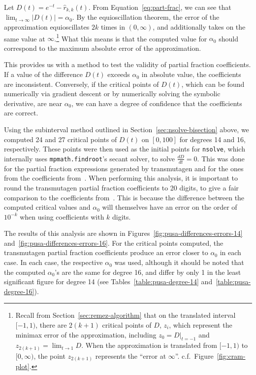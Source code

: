 Let $D(t) = e^{-t} - \hat{r}_{k,k}(t)$. From Equation~\ref{eq:part-frac}, we can see that
$\lim_{t\to\infty}{\left|D(t) \right|} = \alpha_0$. By the
equioscillation theorem, the error of the approximation equioscillates $2k$
times in $(0, \infty)$, and additionally takes on the same value at
$\infty$.\footnote{Recall from Section~\ref{sec:remez-algorithm} that on the
  translated interval $[-1, 1)$, there are $2(k+1)$ critical points of $D$,
  $z_i$, which represent the minimax error of the approximation, including
  $z_0 = D|_{t=-1}$ and $z_{2(k+1)}=\lim_{t\to 1}{D}$. When the approximation
  is translated from $[-1, 1)$ to $[0, \infty)$, the point $z_{2(k + 1)}$
  represents the ``error at $\infty$''. c.f.\ Figure~\ref{fig:cram-plot}.}
What this means is that the computed value for $\alpha_0$ should correspond to
the maximum absolute error of the approximation.

This provides us with a method to test the validity of partial fraction
coefficients. If a value of the difference $D(t)$ exceeds $\alpha_0$ in
absolute value, the coefficients are inconsistent. Conversely, if the critical
points of $D(t)$, which can be found numerically via gradient descent or by
numerically solving the symbolic derivative, are near $\alpha_0$, we can have
a degree of confidence that the coefficients are correct.

Using the subinterval method outlined in Section~\ref{sec:nsolve-bisection}
above, we computed 24 and 27 critical points of $D(t)$ on $[0, 100]$ for degrees
14 and 16, respectively. These points were then used as the initial points for
\texttt{nsolve}, which internally uses \texttt{mpmath.findroot}'s secant
solver, to solve $\frac{dD}{dt}=0$. This was done for the partial fraction
expressions generated by transmutagen and for the ones from the coefficients
from~\cite{pusa2012correction}.  When performing this analysis, it is
important to round the transmutagen partial fraction coefficients to 20
digits, to give a fair comparison to the coefficients
from~\cite{pusa2012correction}. This is because the difference between the
computed critical values and $\alpha_0$ will themselves have an error on the order
of $10^{-k}$ when using coefficients with $k$ digits.

The results of this analysis are shown in
Figures~\ref{fig:pusa-differences-errors-14}
and~\ref{fig:pusa-differences-errors-16}. For the critical points computed,
the transmutagen partial fraction coefficients produce an error closer to
$\alpha_0$ in each case. In each case, the respective $\alpha_0$ was used,
although it should be noted that the computed $\alpha_0$'s are the
same for degree 16, and differ by only 1 in the least significant figure for
degree 14 (see Tables~\ref{table:pusa-degree-14} and~\ref{table:pusa-degree-16}).

